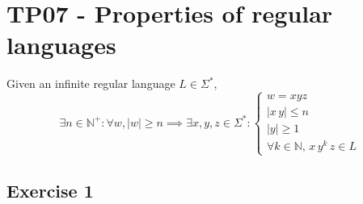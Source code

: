 \setcounter{section}{6}
\section{TP07 - Properties of regular languages}
{
\renewcommand{\thesubsubsection}{\thesubsection\alph{subsubsection}}
\begin{lemma} \label{lem:pump}
Given an infinite regular language $L \in \Sigma^*$,
\begin{equation*}
	\exists n \in \mathbb{N}^+ \colon \forall w, |w|\geq n \implies \exists x, y, z \in \Sigma^* \colon 
	\begin{cases}
		w = xyz \\
		|x\,y| \leq n\\
		|y| \geq 1\\
		\forall k \in \mathbb{N},\,x\,y^k\,z \in L
	\end{cases}
\end{equation*} 
\end{lemma}
\subsection{Exercise 1}
}
